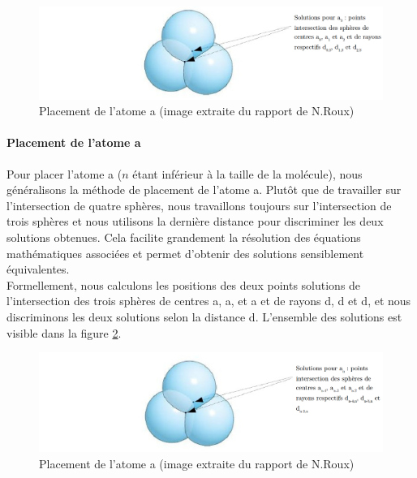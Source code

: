 \begin{figure}
	\centering
	\includegraphics[scale=0.3]{images/3_spheres.png}
	\caption{Placement de l'atome a (image extraite du rapport de N.Roux)}
	\label{fplacement_a3}

\end{figure}



\paragraph{Placement de l'atome a} Pour placer l'atome a ($n$ étant inférieur à la taille de la molécule), nous généralisons la méthode de placement de l'atome a. Plutôt que de travailler sur l'intersection de quatre sphères, nous travaillons toujours sur l'intersection de trois sphères et nous utilisons la dernière distance pour discriminer les deux solutions obtenues. Cela facilite grandement la résolution des équations mathématiques associées et permet d'obtenir des solutions sensiblement équivalentes. \\
Formellement, nous calculons les positions des deux points solutions de l'intersection des trois sphères de centres a, a, et a et de rayons d, d et d, et nous discriminons les deux solutions selon la distance d.  L'ensemble des solutions est visible dans la figure \ref{fplacement_an}.

\begin{figure}
	\centering
	\includegraphics[scale=0.3]{images/3_spheres_gen.png}
	\caption{Placement de l'atome a (image extraite du rapport de N.Roux)}
	\label{fplacement_an}

\end{figure}


